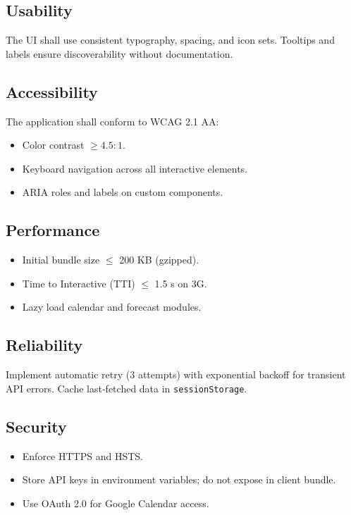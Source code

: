 \documentclass[12pt,a4paper]{article}
\begin{document}
\subsection*{Usability}
The UI shall use consistent typography, spacing, and icon sets. Tooltips and labels
ensure discoverability without documentation.

\subsection*{Accessibility}
The application shall conform to WCAG 2.1 AA:
\begin{itemize}[nosep]
  \item Color contrast $\ge 4.5:1$.
  \item Keyboard navigation across all interactive elements.
  \item ARIA roles and labels on custom components.
\end{itemize}

\subsection*{Performance}
\begin{itemize}[nosep]
  \item Initial bundle size $\le$ 200 KB (gzipped).
  \item Time to Interactive (TTI) $\le$ 1.5 s on 3G.
  \item Lazy load calendar and forecast modules.
\end{itemize}

\subsection*{Reliability}
Implement automatic retry (3 attempts) with exponential backoff for transient API errors.
Cache last‐fetched data in \texttt{sessionStorage}.

\subsection*{Security}
\begin{itemize}[nosep]
  \item Enforce HTTPS and HSTS.
  \item Store API keys in environment variables; do not expose in client bundle.
  \item Use OAuth 2.0 for Google Calendar access.
\end{itemize}
\end{document}
